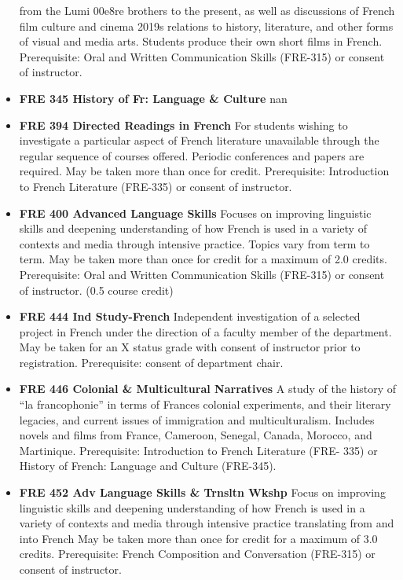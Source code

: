 \documentclass[
  letterpaper,
]{scrbook}
\begin{document}
\begin{itemize}
  from the Lumi 00e8re brothers to the present, as well as discussions
  of French film culture and cinema 2019s relations to history,
  literature, and other forms of visual and media arts. Students produce
  their own short films in French. Prerequisite: Oral and Written
  Communication Skills (FRE-315) or consent of instructor.
\item
  \textbf{FRE 345 History of Fr: Language \& Culture} nan
\item
  \textbf{FRE 394 Directed Readings in French} For students wishing to
  investigate a particular aspect of French literature unavailable
  through the regular sequence of courses offered. Periodic conferences
  and papers are required. May be taken more than once for credit.
  Prerequisite: Introduction to French Literature (FRE-335) or consent
  of instructor.
\item
  \textbf{FRE 400 Advanced Language Skills} Focuses on improving
  linguistic skills and deepening understanding of how French is used in
  a variety of contexts and media through intensive practice. Topics
  vary from term to term. May be taken more than once for credit for a
  maximum of 2.0 credits. Prerequisite: Oral and Written Communication
  Skills (FRE-315) or consent of instructor. (0.5 course credit)
\item
  \textbf{FRE 444 Ind Study-French} Independent investigation of a
  selected project in French under the direction of a faculty member of
  the department. May be taken for an X status grade with consent of
  instructor prior to registration. Prerequisite: consent of department
  chair.
\item
  \textbf{FRE 446 Colonial \& Multicultural Narratives} A study of the
  history of ``la francophonie'' in terms of France\textquotesingle s
  colonial experiments, and their literary legacies, and current issues
  of immigration and multiculturalism. Includes novels and films from
  France, Cameroon, Senegal, Canada, Morocco, and Martinique.
  Prerequisite: Introduction to French Literature (FRE- 335) or History
  of French: Language and Culture (FRE-345).
\item
  \textbf{FRE 452 Adv Language Skills \& Trnsltn Wkshp} Focus on
  improving linguistic skills and deepening understanding of how French
  is used in a variety of contexts and media through intensive practice
  translating from and into French May be taken more than once for
  credit for a maximum of 3.0 credits. Prerequisite: French Composition
  and Conversation (FRE-315) or consent of instructor.

\end{itemize}
\end{document}
